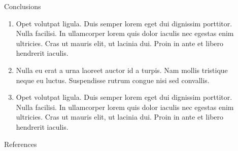 \documentclass{beamer} %
\begin{document}
\begin{frame}[t]
\begin{columns}[t]
\begin{column}{0.3\textwidth}

		\end{column}

		\begin{column}{0.02\textwidth}\end{column} %

		\begin{column}{0.3\textwidth} %


			\begin{block}{Conclusions}
				\begin{enumerate}
					\item \alert{Opet volutpat ligula.} Duis semper lorem eget dui dignissim porttitor. Nulla facilisi. In ullamcorper lorem quis dolor iaculis nec egestas enim ultricies. Cras ut mauris elit, ut lacinia dui. Proin in ante et libero hendrerit iaculis.
					\item \alert{Nulla eu erat a urna laoreet auctor id a turpis.} Nam mollis tristique neque eu luctus. Suspendisse rutrum congue nisi sed convallis.
					\item \alert{Opet volutpat ligula.} Duis semper lorem eget dui dignissim porttitor. Nulla facilisi. In ullamcorper lorem quis dolor iaculis nec egestas enim ultricies. Cras ut mauris elit, ut lacinia dui. Proin in ante et libero hendrerit iaculis.
				\end{enumerate}
			\end{block}


			\begin{block}{References}
				\tiny %
				\vspace{-1ex} %
			\end{block}



\end{column}
\end{columns}
\end{frame}
\end{document}
